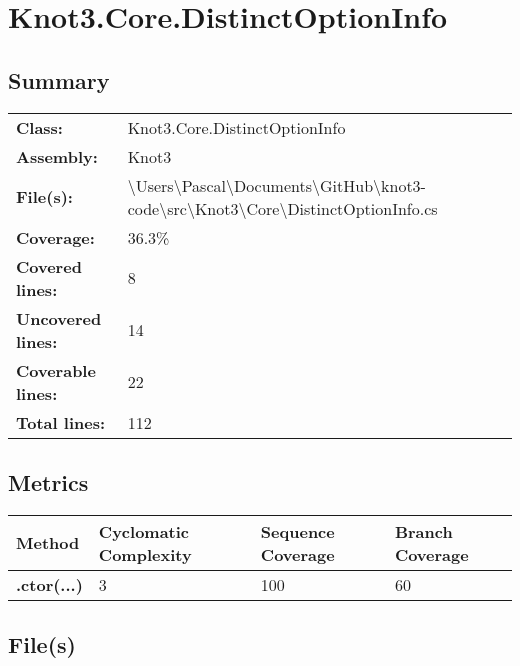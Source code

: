 \documentclass[a4paper,10pt]{article}
\begin{document}
\section{Knot3.Core.DistinctOptionInfo}
\subsection{Summary}
\begin{longtable}[l]{ll}
\textbf{Class:} & Knot3.Core.DistinctOptionInfo\\
\textbf{Assembly:} & Knot3\\
\textbf{File(s):} & \begin{minipage}[t]{12cm}{\textbackslash Users\textbackslash Pascal\textbackslash Documents\textbackslash GitHub\textbackslash knot3-code\textbackslash src\textbackslash Knot3\textbackslash Core\textbackslash DistinctOptionInfo.cs}\end{minipage} \\
\textbf{Coverage:} & 36.3\%\\
\textbf{Covered lines:} & 8\\
\textbf{Uncovered lines:} & 14\\
\textbf{Coverable lines:} & 22\\
\textbf{Total lines:} & 112\\
\end{longtable}
\subsection{Metrics}
\begin{longtable}[l]{|l|l|l|l|}
\hline
\textbf{Method} & \textbf{Cyclomatic Complexity} & \textbf{Sequence Coverage} & \textbf{Branch Coverage}\\
\hline
\textbf{.ctor(...)} & 3 & 100 & 60\\
\hline
\end{longtable}
\subsection{File(s)}
\end{document}
